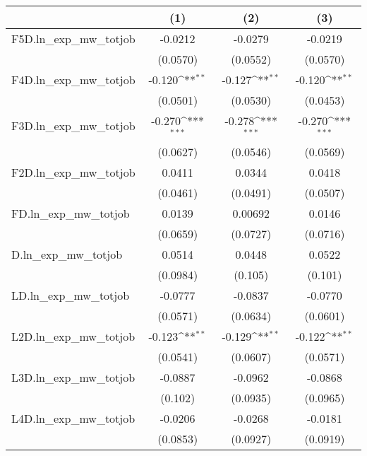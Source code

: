 {
\def\sym#1{\ifmmode^{#1}\else\(^{#1}\)\fi}
\begin{tabular}{l*{3}{c}}
\hline\hline
          &\multicolumn{1}{c}{(1)}         &\multicolumn{1}{c}{(2)}         &\multicolumn{1}{c}{(3)}         \\
\hline
F5D.ln_exp_mw_totjob&  -0.0212         &  -0.0279         &  -0.0219         \\
          & (0.0570)         & (0.0552)         & (0.0570)         \\
[1em]
F4D.ln_exp_mw_totjob&   -0.120\sym{**} &   -0.127\sym{**} &   -0.120\sym{**} \\
          & (0.0501)         & (0.0530)         & (0.0453)         \\
[1em]
F3D.ln_exp_mw_totjob&   -0.270\sym{***}&   -0.278\sym{***}&   -0.270\sym{***}\\
          & (0.0627)         & (0.0546)         & (0.0569)         \\
[1em]
F2D.ln_exp_mw_totjob&   0.0411         &   0.0344         &   0.0418         \\
          & (0.0461)         & (0.0491)         & (0.0507)         \\
[1em]
FD.ln_exp_mw_totjob&   0.0139         &  0.00692         &   0.0146         \\
          & (0.0659)         & (0.0727)         & (0.0716)         \\
[1em]
D.ln_exp_mw_totjob&   0.0514         &   0.0448         &   0.0522         \\
          & (0.0984)         &  (0.105)         &  (0.101)         \\
[1em]
LD.ln_exp_mw_totjob&  -0.0777         &  -0.0837         &  -0.0770         \\
          & (0.0571)         & (0.0634)         & (0.0601)         \\
[1em]
L2D.ln_exp_mw_totjob&   -0.123\sym{**} &   -0.129\sym{**} &   -0.122\sym{**} \\
          & (0.0541)         & (0.0607)         & (0.0571)         \\
[1em]
L3D.ln_exp_mw_totjob&  -0.0887         &  -0.0962         &  -0.0868         \\
          &  (0.102)         & (0.0935)         & (0.0965)         \\
[1em]
L4D.ln_exp_mw_totjob&  -0.0206         &  -0.0268         &  -0.0181         \\
          & (0.0853)         & (0.0927)         & (0.0919)         \\

\end{tabular}}
